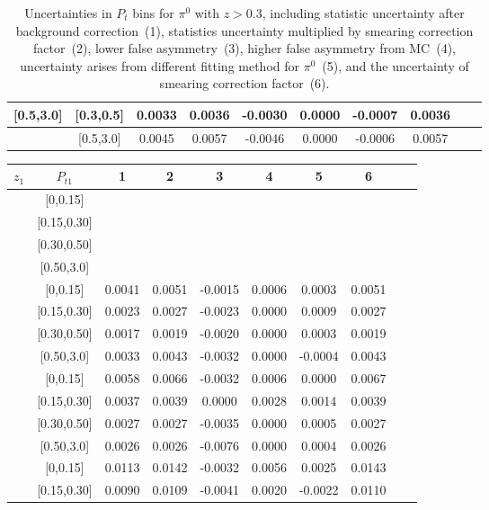 \begin{table}[H]
\begin{tabular}{|c| c| c| c| c| c| c| c| c| c|}
[0.5,3.0]	&	[0.3,0.5]	&	0.0033	&	0.0036	&	-0.0030	&	0.0000	&	-0.0007	&	0.0036	\\ \hline
[0.5,3.0]	&	[0.5,3.0]	&	0.0045	&	0.0057	&	-0.0046	&	0.0000	&	-0.0006	&	0.0057	\\ \hline
\end{tabular}
\caption{Uncertainties in $P_t$ bins for $\pi^0$ with $z>0.3$, including statistic uncertainty after background correction~(1), statistics uncertainty multiplied by smearing correction factor~(2), lower false asymmetry~(3), higher false asymmetry from MC~(4), uncertainty arises from different fitting method for $\pi^0$~(5), and the uncertainty of smearing correction factor~(6).}
\label{tab:pi0foetaerrors_pt}
\end{table}

\begin{table}[H]\scriptsize
\centering
\begin{tabular}{|c| c| c| c| c| c| c| c| c| c|}
\hline
$z_1$ & $P_{t1}$ & 1 & 2 & 3 & 4& 5& 6 \\ \hline
[[0.2,0.3]	&	[0,0.15]	&		&		&		&		&		&		\\ \hline
[0.2,0.3]	&	[0.15,0.30]	&		&		&		&		&		&		\\ \hline
[0.2,0.3]	&	[0.30,0.50]	&		&		&		&		&		&		\\ \hline
[0.2,0.3]	&	[0.50,3.0]	&		&		&		&		&		&		\\ \hline
[0.3,0.5]	&	[0,0.15]	&	0.0041	&	0.0051	&	-0.0015	&	0.0006	&	0.0003	&	0.0051	\\ \hline
[0.3,0.5]	&	[0.15,0.30]	&	0.0023	&	0.0027	&	-0.0023	&	0.0000	&	0.0009	&	0.0027	\\ \hline
[0.3,0.5]	&	[0.30,0.50]	&	0.0017	&	0.0019	&	-0.0020	&	0.0000	&	0.0003	&	0.0019	\\ \hline
[0.3,0.5]	&	[0.50,3.0]	&	0.0033	&	0.0043	&	-0.0032	&	0.0000	&	-0.0004	&	0.0043	\\ \hline
[0.5,0.7]	&	[0,0.15]	&	0.0058	&	0.0066	&	-0.0032	&	0.0006	&	0.0000	&	0.0067	\\ \hline
[0.5,0.7]	&	[0.15,0.30]	&	0.0037	&	0.0039	&	0.0000	&	0.0028	&	0.0014	&	0.0039	\\ \hline
[0.5,0.7]	&	[0.30,0.50]	&	0.0027	&	0.0027	&	-0.0035	&	0.0000	&	0.0005	&	0.0027	\\ \hline
[0.5,0.7]	&	[0.50,3.0]	&	0.0026	&	0.0026	&	-0.0076	&	0.0000	&	0.0004	&	0.0026	\\ \hline
[0.7,1.0]	&	[0,0.15]	&	0.0113	&	0.0142	&	-0.0032	&	0.0056	&	0.0025	&	0.0143	\\ \hline
[0.7,1.0]	&	[0.15,0.30]	&	0.0090	&	0.0109	&	-0.0041	&	0.0020	&	-0.0022	&	0.0110	\\ \hline

\end{tabular}
\end{table}
